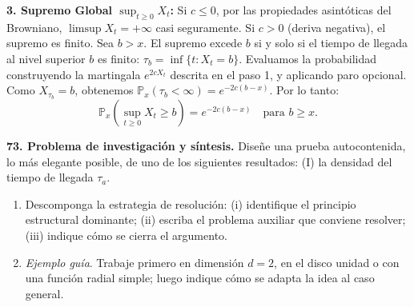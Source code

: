 \documentclass[11pt, letterpaper]{article}
\begin{document}
\begin{solucion}
    \textbf{3. Supremo Global $\sup_{t \ge 0} X_t$:}
    Si $c \le 0$, por las propiedades asintóticas del Browniano, $\limsup X_t = +\infty$ casi seguramente.
    Si $c > 0$ (deriva negativa), el supremo es finito. Sea $b > x$. El supremo excede $b$ si y solo si el tiempo de llegada al nivel superior $b$ es finito: $\tau_b = \inf\{t : X_t = b\}$.
    Evaluamos la probabilidad construyendo la martingala $e^{2c X_t}$ descrita en el paso 1, y aplicando paro opcional. Como $X_{\tau_b} = b$, obtenemos $\mathbb{P}_x(\tau_b < \infty) = e^{-2c(b-x)}$.
    Por lo tanto:
    \[ \mathbb{P}_x(\sup_{t \ge 0} X_t \ge b) = e^{-2c(b-x)} \quad \text{para } b \ge x. \]
\end{solucion}

\newpage

\begin{ejercicio}
    \textbf{73. Problema de investigación y síntesis.} Diseñe una prueba autocontenida, lo más elegante posible, de uno de los siguientes resultados: (I) la densidad del tiempo de llegada $\tau_a$.
    \begin{enumerate}
        \item Descomponga la estrategia de resolución: (i) identifique el principio estructural dominante; (ii) escriba el problema auxiliar que conviene resolver; (iii) indique cómo se cierra el argumento.
        \item \textit{Ejemplo guía}. Trabaje primero en dimensión $d=2$, en el disco unidad o con una función radial simple; luego indique cómo se adapta la idea al caso general.
    \end{enumerate}
\end{ejercicio}

\vspace{5mm}
\end{document}
